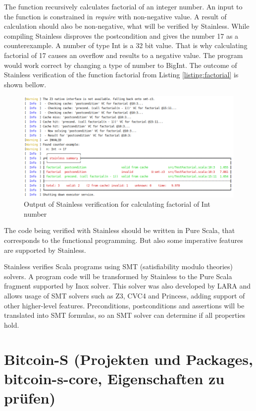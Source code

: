 The function recursively calculates factorial of an integer number.
An input to the function is constrained in \textit{require} with non-negative value.
A result of calculation should also be non-negative, what will be verified by Stainless.
While compiling Stainless disproves the postcondition and gives the number 17 as a counterexample.
A number of type Int is a 32 bit value.
That is why calculating factorial of 17 causes an overflow and results to a negative value.
The program would work correct by changing a type of number to BigInt.
The outcome of Stainless verification of the function factorial from Listing \ref{listing:factorial} is shown bellow.

\begin{figure}[H]
	\centering
		\includegraphics[scale=0.5]{images/output1.png}
	\caption{Output of Stainless verification for calculating factorial of Int number}
	\label{fig:output1}
\end{figure}

The code being verified with Stainless should be written in Pure Scala, that corresponds to the functional programming. But also some imperative features are supported by Stainless.

Stainless verifies Scala programs using SMT (satisfiability modulo theories) solvers. A program code will be transformed by Stainless to the Pure Scala fragment supported by Inox solver. 
This solver was also developed by LARA and allows usage of SMT solvers such as Z3, CVC4 and Princess, adding support of other higher-level features.
Preconditions, postconditions and assertions will be translated into SMT formulas, so an SMT solver can determine if all properties hold.


\section{Bitcoin-S (Projekten und Packages, bitcoin-s-core, Eigenschaften zu prüfen)}
\label{sec:bitcoin_s}

